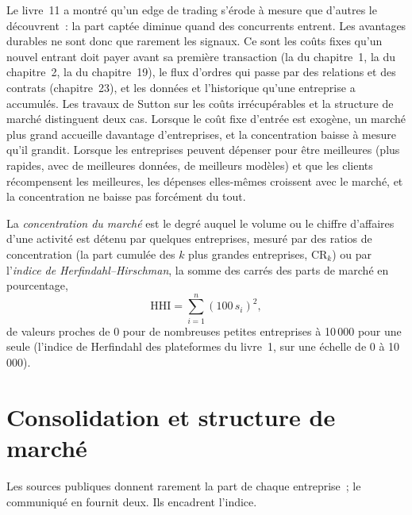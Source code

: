 Le livre~11 a montré qu'un edge de trading s'érode à mesure que d'autres le découvrent~: la part captée diminue quand des concurrents entrent. Les avantages durables ne sont donc que rarement les
signaux. Ce sont les coûts fixes qu'un nouvel entrant doit payer avant sa première transaction (la  du chapitre~1, la  du chapitre~2,
la  du chapitre~19), le flux d'ordres qui passe par des relations et des contrats (chapitre~23), et les données et l'historique qu'une entreprise a
accumulés. Les travaux de Sutton sur les coûts irrécupérables et la structure de marché distinguent deux cas. Lorsque le coût fixe d'entrée est exogène, un marché plus grand
accueille davantage d'entreprises, et la concentration baisse à mesure qu'il grandit. Lorsque les entreprises peuvent dépenser pour être meilleures (plus rapides, avec de meilleures données, de meilleurs modèles) et que les clients
récompensent les meilleures, les dépenses elles-mêmes croissent avec le marché, et la concentration ne baisse pas forcément du tout.

\begin{definition}\label{def:fm:competition-and-the-future:hhi}
La \emph{concentration du marché} est le degré auquel le volume ou le chiffre d'affaires d'une activité est détenu par quelques entreprises, mesuré par
des ratios de concentration (la part cumulée des $k$ plus grandes entreprises, $\mathrm{CR}_k$) ou par l'\emph{indice de Herfindahl--Hirschman},
la somme des carrés des parts de marché en pourcentage,
\[ \mathrm{HHI}=\sum_{i=1}^n(100\,s_i)^2, \]
de valeurs proches de 0 pour de nombreuses petites entreprises à 10\,000 pour une seule (l'indice de Herfindahl des plateformes du livre~1, sur une échelle de 0 à 10\,000).
\end{definition}

\section{Consolidation et structure de marché}

Les sources publiques donnent rarement la part de chaque entreprise~; le communiqué en fournit deux. Ils encadrent l'indice.

